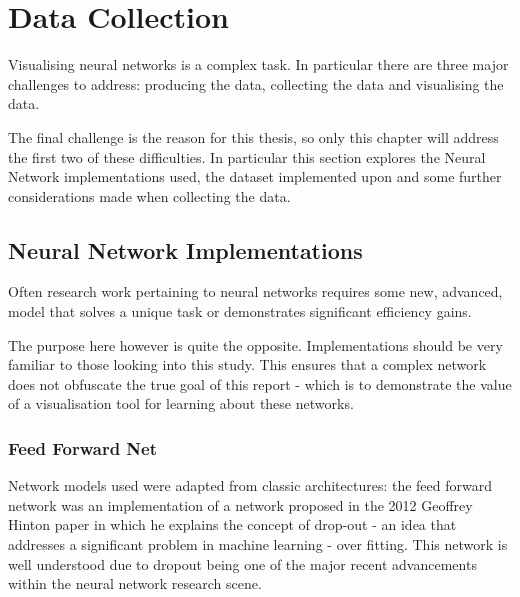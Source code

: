 \documentclass[a4paper,11pt,titlepage]{article}
\begin{document}
\clearpage
\section{Data Collection}
	Visualising neural networks is a complex task. In particular there are three major challenges to address: producing the data, collecting the data and visualising the data.
	\par 
	The final challenge is the reason for this thesis, so only this chapter will address the first two of these difficulties. In particular this section explores the Neural Network implementations used, the dataset implemented upon and some further considerations made when collecting the data.
	
	\subsection{Neural Network Implementations}
	Often research work pertaining to neural networks requires some new, advanced, model that solves a unique task or demonstrates significant efficiency gains.
	\par 
	The purpose here however is quite the opposite. Implementations should be very familiar to those looking into this study. This ensures that a complex network does not obfuscate the true goal of this report - which is to demonstrate the value of a visualisation tool for learning about these networks.
	
	\begin{figure}[H]
    			\caption{}%
	\end{figure}	


		\subsubsection{Feed Forward Net}
		Network models used were adapted from classic architectures: the feed forward network was an implementation of a network proposed in the 2012 Geoffrey Hinton paper in which he explains the concept of drop-out \cite{Hinton2012} - an idea that addresses a significant problem in machine learning - over fitting. This network is well understood due to dropout being one of the major recent advancements within the neural network research scene.
	
\end{document}
